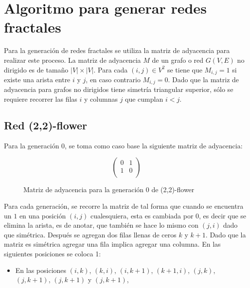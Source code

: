 \section{Algoritmo para generar redes fractales}

Para la generación de redes fractales se utiliza la matriz de adyacencia para realizar este proceso. La matriz de adyacencia $M$ de un grafo o red $G(V,E)$ no dirigido es de tamaño $|V|\times|V|$. Para cada $(i,j)\in V^2$ se tiene que $M_{i,j}=1$ si existe una arista entre $i$ y $j$, en caso contrario $M_{i,j}=0$. 
Dado que la matriz de adyacencia para grafos no dirigidos tiene simetría triangular superior, sólo se requiere recorrer las filas $i$ y columnas $j$ que cumplan $i<j$.

\subsection{Red (2,2)-flower}

Para la generación 0, se toma como caso base la siguiente matriz de adyacencia:

\begin{figure}[H]
    \centering
\[ 
\left( \begin{array}{cc}
 0 & 1  \\ 
 1 & 0 \\
\end{array} \right)\]
\caption{Matriz de adyacencia para la generación 0 de (2,2)-flower}
\end{figure}

Para cada generación, se recorre la matriz de tal forma que cuando se encuentra un $1$ en una posición $(i,j)$ cualesquiera, esta es cambiada por 0, es decir que se elimina la arista, es de anotar, que también se hace lo mismo con $(j,i)$ dado que simétrica.  Después se agregan dos filas llenas de ceros $k$ y $k+1$. Dado que la matriz es simétrica agregar una fila implica agregar una columna. En las siguientes posiciones se coloca 1:

\begin{itemize}
    \item En las posiciones $(i,k)$, $(k,i)$, $(i,k+1)$, $(k+1,i)$, $(j,k)$, $(j,k+1)$, $(j,k+1)$ y $(j,k+1)$,
\end{itemize}

